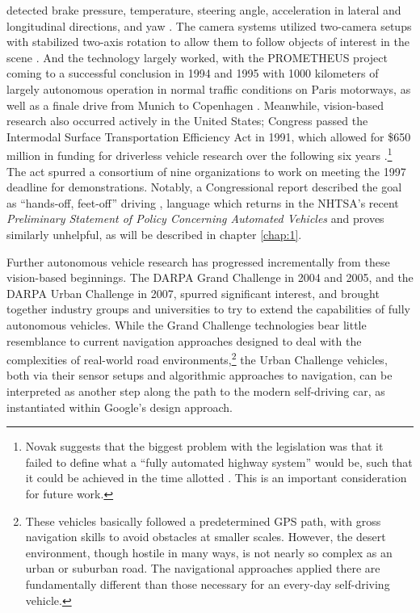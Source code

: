 detected brake pressure, temperature, steering angle, acceleration in
lateral and longitudinal directions, and yaw \cite[p.
  2]{ulmerVITA-II}. The camera systems
utilized two-camera setups with stabilized two-axis rotation to allow
them to follow objects of interest in the scene \cite{cameraPlatform}. And the
technology largely worked, with the PROMETHEUS project coming to a
successful conclusion in 1994 and 1995 with 1000 kilometers of largely
autonomous operation in normal traffic conditions on Paris motorways,
as well as a finale drive from Munich to Copenhagen \cite{makingBertha}.
Meanwhile, vision-based research also occurred actively in the United States;
Congress passed the Intermodal 
Surface Transportation Efficiency Act in 1991, which allowed for \$650 million
in funding for driverless vehicle research over the following six
years
\cite{novakAlmost}.\footnote{Novak suggests that the biggest problem with
the legislation was that it failed to define what a ``fully automated
highway system'' would be, such that it could be achieved in the time
allotted \cite{novakAlmost}. This is an important consideration for
future work.} The act spurred a consortium of nine organizations to
work on meeting the 1997 deadline for demonstrations.
Notably, a Congressional report described the goal as ``hands-off,
feet-off'' driving \cite{novakAlmost}, language which returns in the NHTSA's recent
\emph{Preliminary Statement of Policy Concerning Automated Vehicles}
and proves similarly unhelpful, as will be described in chapter
\ref{chap:1}.


Further autonomous vehicle research has progressed incrementally from
these vision-based beginnings. The
DARPA Grand Challenge in 2004 and 2005, and the DARPA Urban Challenge
in 2007, spurred significant interest, and brought together industry
groups and universities to 
try to extend the capabilities of fully autonomous vehicles. While the
Grand Challenge technologies bear little resemblance to current
navigation approaches designed to deal with the complexities of
real-world road environments,\footnote{These vehicles basically
  followed a predetermined GPS path, with gross navigation skills to
  avoid obstacles at smaller scales. However, the desert environment,
  though hostile in many ways, is not nearly so complex as an urban or
suburban road. The navigational approaches applied there are
fundamentally different than those necessary for an every-day
self-driving vehicle.} the Urban Challenge
vehicles, both via their sensor setups and algorithmic approaches to
navigation, can be interpreted as another step along the path to the
modern self-driving car, as instantiated within Google's design approach. 

